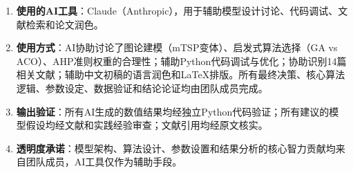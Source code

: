 \documentclass[12pt,a4paper]{ctexart}
\begin{document}
\begin{enumerate}[leftmargin=*, nosep]
    \item \textbf{使用的AI工具}：Claude（Anthropic），用于辅助模型设计讨论、代码调试、文献检索和论文润色。
    \item \textbf{使用方式}：AI协助讨论了图论建模（mTSP变体）、启发式算法选择（GA vs ACO）、AHP准则权重的合理性；辅助Python代码调试与优化；协助识别14篇相关文献；辅助中文初稿的语言润色和LaTeX排版。所有最终决策、核心算法逻辑、参数设定、数据验证和结论论证均由团队成员完成。
    \item \textbf{输出验证}：所有AI生成的数值结果均经独立Python代码验证；所有建议的模型假设均经文献和实践经验审查；文献引用均经原文核实。
    \item \textbf{透明度承诺}：模型架构、算法设计、参数设置和结果分析的核心智力贡献均来自团队成员，AI工具仅作为辅助手段。
\end{enumerate}

\newpage



\end{document}
